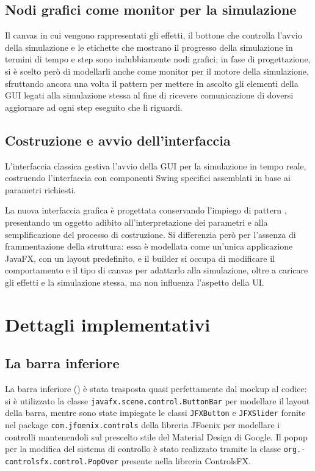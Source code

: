         \subsection{Nodi grafici come monitor per la simulazione}
            Il canvas in cui vengono rappresentati gli effetti, il bottone che controlla l'avvio della simulazione e le etichette che mostrano il progresso della simulazione in termini di tempo e step sono indubbiamente nodi grafici; in fase di progettazione, si è scelto però di modellarli anche come monitor per il motore della simulazione, sfruttando ancora una volta il pattern  per mettere in ascolto gli elementi della GUI legati alla simulazione stessa al fine di ricevere comunicazione di doversi aggiornare ad ogni step eseguito che li riguardi.

        \subsection{Costruzione e avvio dell'interfaccia}\label{sub:avvio}
            L'interfaccia classica gestiva l'avvio della GUI per la simulazione in tempo reale, costruendo l'interfaccia con componenti Swing specifici assemblati in base ai parametri richiesti.

            La nuova interfaccia grafica è progettata conservando l'impiego di pattern , presentando un oggetto adibito all'interpretazione dei parametri e alla semplificazione del processo di costruzione.
            Si differenzia però per l'assenza di frammentazione della struttura: essa è modellata come un'unica applicazione JavaFX, con un layout predefinito, e il builder si occupa di modificare il comportamento e il tipo di canvas per adattarlo alla simulazione, oltre a caricare gli effetti e la simulazione stessa, ma non influenza l'aspetto della UI.

    \section{Dettagli implementativi}\label{sec:dettagli}

        \subsection{La barra inferiore}\label{sub:barra}
            La barra inferiore () è stata trasposta quasi perfettamente dal mockup al codice: si è utilizzato la classe \texttt{javafx\dothyp scene\dothyp control\dothyp ButtonBar} per modellare il layout della barra, mentre sono state impiegate le classi \texttt{JFXButton} e \texttt{JFXSlider} fornite nel package \texttt{com\dothyp jfoenix\dothyp controls} della libreria JFoenix per modellare i controlli mantenendoli sul prescelto stile del Material Design di Google.
            Il popup per la modifica del sistema di controllo è stato realizzato tramite la classe \texttt{org\dothyp controlsfx\dothyp control\dothyp PopOver} presente nella libreria ControlsFX.

